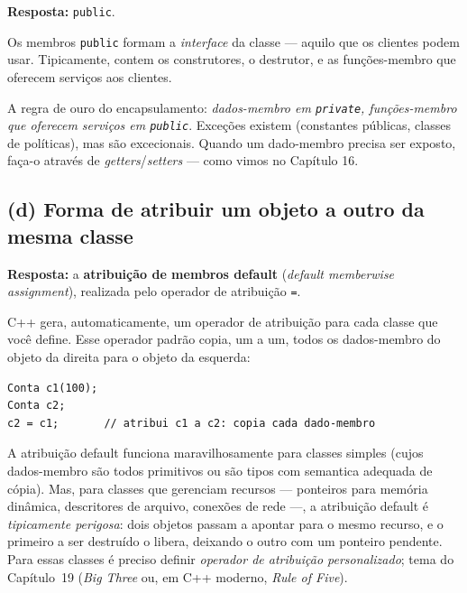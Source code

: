 \documentclass[11pt,a4paper]{article}
\begin{document}
\begin{resposta}\textbf{Resposta:} \texttt{public}.\end{resposta}

Os membros \texttt{public} formam a \emph{interface} da classe --- aquilo que os clientes podem usar. Tipicamente, contem os construtores, o destrutor, e as fun\c{c}\~oes-membro que oferecem servi\c{c}os aos clientes.

\begin{boaprat}
A regra de ouro do encapsulamento: \emph{dados-membro em \texttt{private}, fun\c{c}\~oes-membro que oferecem servi\c{c}os em \texttt{public}}. Exce\c{c}\~oes existem (constantes p\'ublicas, classes de pol\'iticas), mas s\~ao excecionais. Quando um dado-membro precisa ser exposto, fa\c{c}a-o atrav\'es de \emph{getters}/\emph{setters} ---  como vimos no Cap\'itulo 16.
\end{boaprat}

\subsection*{(d) Forma de atribuir um objeto a outro da mesma classe}

\begin{resposta}\textbf{Resposta:} a \textbf{atribui\c{c}\~ao de membros default} (\emph{default memberwise assignment}), realizada pelo operador de atribui\c{c}\~ao \texttt{=}.\end{resposta}

C++ gera, automaticamente, um operador de atribui\c{c}\~ao para cada classe que voc\^e define. Esse operador padr\~ao copia, um a um, todos os dados-membro do objeto da direita para o objeto da esquerda:

\begin{lstlisting}[style=cppcode,numbers=none]
Conta c1(100);
Conta c2;
c2 = c1;       // atribui c1 a c2: copia cada dado-membro
\end{lstlisting}

\begin{errocomum}
A atribui\c{c}\~ao default funciona maravilhosamente para classes simples (cujos dados-membro s\~ao todos primitivos ou s\~ao tipos com semantica adequada de c\'opia). Mas, para classes que gerenciam recursos --- ponteiros para mem\'oria din\^amica, descritores de arquivo, conex\~oes de rede ---, a atribui\c{c}\~ao default \'e \emph{tipicamente perigosa}: dois objetos passam a apontar para o mesmo recurso, e o primeiro a ser destru\'ido o libera, deixando o outro com um ponteiro pendente. Para essas classes \'e preciso definir \emph{operador de atribui\c{c}\~ao personalizado}; tema do Cap\'itulo~19 (\emph{Big Three} ou, em C++ moderno, \emph{Rule of Five}).
\end{errocomum}
\end{document}
